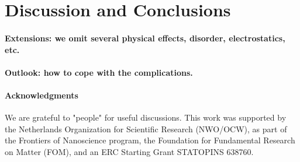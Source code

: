 \documentclass[english, twocolumn, 10pt, aps, superscriptaddress, floatfix, prb, citeautoscript]{revtex4-1}
\renewcommand{\comment}[2]{#2}
\renewcommand{\comment}{\paragraph}
\begin{document}
\section{Discussion and Conclusions}

\comment{Extensions: we omit several physical effects, disorder, electrostatics, etc.}

\comment{Outlook: how to cope with the complications.}

\comment{Acknowledgments}

We are grateful to "people" for useful discussions.
This work was supported by the Netherlands Organization for Scientific Research (NWO/OCW), as part of the Frontiers of Nanoscience program, the Foundation for Fundamental Research on Matter (FOM), and an ERC Starting Grant STATOPINS 638760.



\end{document}
